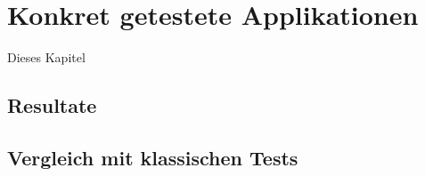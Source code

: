 \chapter{Konkret getestete Applikationen}\label{chapter:concretetests}


Dieses Kapitel


\section{Resultate}\label{section:testresults}


\section{Vergleich mit klassischen Tests}\label{section:testcomparisonclassic}

